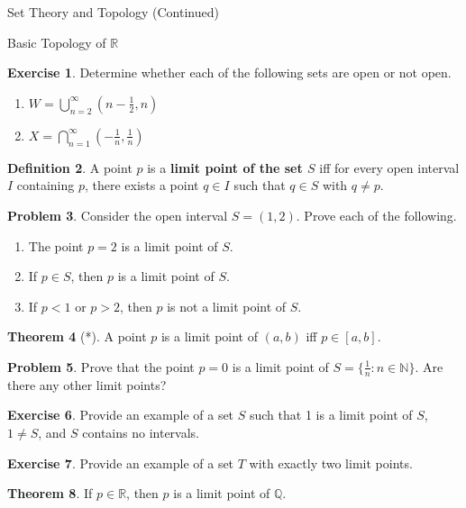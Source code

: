\documentclass[11pt]{article}
\theoremstyle{definition}
\newtheorem{theorem}{Theorem}[section]
\newtheorem{definition}[theorem]{Definition}
\newtheorem{exercise}[theorem]{Exercise}
\newtheorem{problem}[theorem]{Problem}
\begin{document}
\begin{section}{Set Theory and Topology (Continued)}
\begin{subsection}{Basic Topology of $\mathbb{R}$}
\begin{exercise}
Determine whether each of the following sets are open or not open.
\begin{enumerate}
\item $\displaystyle W=\bigcup_{n=2}^{\infty} \left(n - \frac{1}{2},n\right)$
\item $\displaystyle X=\bigcap_{n=1}^{\infty} \left(-\frac{1}{n}, \frac{1}{n}\right)$
\end{enumerate}
\end{exercise}

\begin{definition}
A point $p$ is a \textbf{limit point of the set $S$} iff for every open interval $I$ containing $p$, there exists a point $q \in I$ such that $q \in S$ with $q\neq p$.
\end{definition}

\begin{problem}
Consider the open interval $S=(1,2)$. Prove each of the following.
\begin{enumerate}
\item The point $p=2$ is a limit point of $S$.
\item If $p\in S$, then $p$ is a limit point of $S$.
\item If $p<1$ or $p>2$, then $p$ is not a limit point of $S$.
\end{enumerate}
\end{problem}

\begin{theorem}[*]
A point $p$ is a limit point of $(a,b)$ iff $p\in [a,b]$.
\end{theorem}

\begin{problem}
Prove that the point $p=0$ is a limit point of $S=\{\frac{1}{n}: n \in \mathbb{N}\}$.  Are there any other limit points?
\end{problem}

\begin{exercise}
Provide an example of a set $S$ such that 1 is a limit point of $S$, $1\neq S$, and $S$ contains no intervals.
\end{exercise}

\begin{exercise}
Provide an example of a set $T$ with exactly two limit points.
\end{exercise}

\begin{theorem}
If $p\in\mathbb{R}$, then $p$ is a limit point of $\mathbb{Q}$.
\end{theorem}


\end{subsection}
\end{section}
\end{document}
